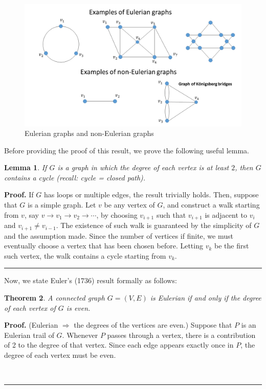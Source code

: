 \documentclass[10.5pt, A4paper, openany, uplatex]{book}
\newtheorem{theorem}{Theorem}[section]
\newtheorem{lemma}[theorem]{Lemma}
\newenvironment{proof}[1][Proof]{\textbf{#1.} }{\  \rule{0.5em}{0.5em}}
\numberwithin{equation}{section}
\begin{document}
\begin{appendices}
	\begin{figure}[h!]
		\begin{center}
			\includegraphics[width = 15cm]{graphs.png}
			\caption{Eulerian graphs and non-Eulerian graphs\label{fig:euler}}
		\end{center}
	\end{figure}
	
	Before providing the proof of this result, we prove the following useful lemma.
	\begin{lemma}\label{lem:cycle}
		If $G$ is a graph in which the degree of each vertex is at least $2$, then $G$ contains a cycle (recall: cycle = closed path).
	\end{lemma}
	
	\begin{proof}
		If $G$ has loops or multiple edges, the result trivially holds.
		Then, suppose that $G$ is a simple graph.
		Let $v$ be any vertex of $G$, and construct a walk starting from $v$, say $v \to v_1 \to v_2 \to \cdots $, by choosing $v_{i+1}$ such that $v_{i+1}$ is adjacent to $v_i$ and $v_{i+1} \neq v_{i-1}$.
		The existence of such walk is guaranteed by the simplicity of $G$ and the assumption made.
		Since the number of vertices if finite, we must eventually choose a vertex that has been chosen before.
		Letting $v_k$ be the first such vertex, the walk contains a cycle starting from $v_k$.
	\end{proof}
	
	Now, we state Euler's (1736) result formally as follows:
	\begin{theorem}
		A connected graph $G = (V,E)$ is Eulerian if and only if the degree of each vertex of $G$ is even.
	\end{theorem}
	
	\begin{proof}
		(Eulerian $\Rightarrow$ the degrees of the vertices are even.) Suppose that $P$ is an Eulerian trail of $G$.
		Whenever $P$ passes through a vertex, there is a contribution of 2 to the degree of that vertex.
		Since each edge appears exactly once in $P$, the degree of each vertex must be even.
		\bigskip
		

\end{proof}
\end{appendices}
\end{document}
